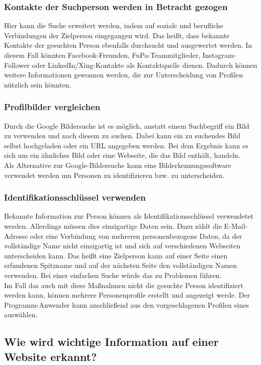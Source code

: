		\subsubsection{Kontakte der Suchperson werden in Betracht gezogen}	
		Hier kann die Suche erweitert werden, indem auf soziale und berufliche Verbindungen der Zielperson eingegangen wird. Das heißt, dass bekannte Kontakte der gesuchten Person ebenfalls durchsucht und ausgewertet werden. In diesem Fall könnten Facebook-Freunden, FuPa-Teammitglieder, Instagram-Follower oder LinkedIn/Xing-Kontakte als Kontaktquelle dienen. Dadurch können weitere Informationen gewonnen werden, die zur Unterscheidung von Profilen nützlich sein könnten.
		\subsubsection{Profilbilder vergleichen}
		Durch die Google Bildersuche ist es möglich, anstatt einem Suchbegriff ein Bild zu verwenden und nach diesem zu suchen. Dabei kann ein zu suchendes Bild selbst hochgeladen oder ein URL angegeben werden. Bei dem Ergebnis kann es sich um ein ähnliches Bild oder eine Webseite, die das Bild enthält, handeln.\\
		Als Alternative zur Google-Bildersuche kann eine Bilderkennungssoftware verwendet werden um Personen zu identifizieren bzw. zu unterscheiden. %
		\subsubsection{Identifikationsschlüssel verwenden}
		Bekannte Information zur Person können als Identifikationsschlüssel verwendetet werden. Allerdings müssen dies einzigartige Daten sein. Dazu zählt die E-Mail-Adresse oder eine Verbindung von mehreren personenbezogene Daten, da der vollständige Name nicht einzigartig ist und sich auf verschiedenen Webseiten unterscheiden kann. Das heißt eine Zielperson kann auf einer Seite einen erfundenen Spitzname und auf der nächsten Seite den vollständigen Namen verwenden. Bei einer einfachen Suche würde das zu Problemen führen.\\
		
		Im Fall das auch mit diese Maßnahmen nicht die gesuchte Person identifiziert werden kann, können mehrere Personenprofile erstellt und angezeigt werde. Der Programm-Anwender kann anschließend aus den vorgeschlagenen Profilen eines auswählen.  
		
	\subsection{Wie wird wichtige Information auf einer Website erkannt?}
	

